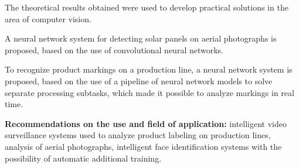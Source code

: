 \documentclass{thesisby}
\begin{document}
The theoretical results obtained were used to develop practical solutions in the area of computer vision.

A neural network system for detecting solar panels on aerial photographs is proposed, based on the use of convolutional neural networks.

To recognize product markings on a production line, a neural network system is proposed, based on the use of a pipeline of neural network models to solve separate processing subtasks, which made it possible to analyze markings in real time.

	
	
	
	
	

\textbf{Recommendations on the use and field of application:}
intelligent video surveillance systems used to analyze product labeling on production lines, analysis of aerial photographs, intelligent face identification systems with the possibility of automatic additional training.
\end{document}
